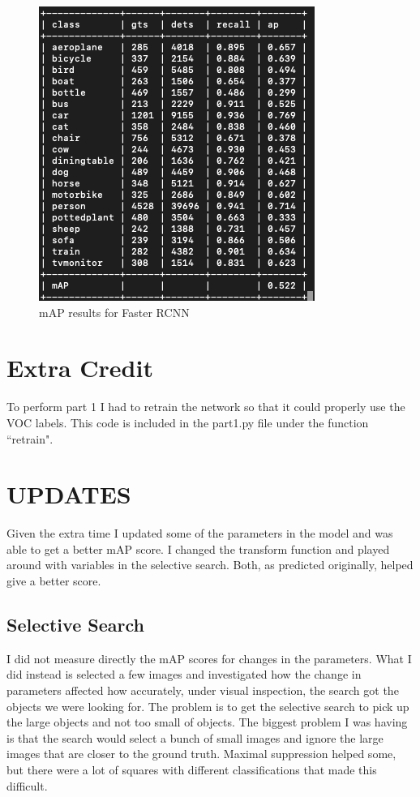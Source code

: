 \documentclass{article}
\begin{document}
\begin{figure}
\centering
\includegraphics[width=\textwidth]{faster_rcnn_r50_fpn_1x_voc07.png}
\caption{mAP results for Faster RCNN}
\label{fig:faster_rcnn}
\end{figure}

\section{Extra Credit}
To perform part 1 I had to retrain the network so that it could properly use the
VOC labels. This code is included in the part1.py file under the function
``retrain".

\section{UPDATES}
\label{sec:updates}
Given the extra time I updated some of the parameters in the model and was able
to get a better mAP score. I changed the transform function and played around
with variables in the selective search. Both, as predicted originally, helped
give a better score. 

\subsection{Selective Search}
I did not measure directly the mAP scores for changes in the parameters. What I
did instead is selected a few images and investigated how the change in
parameters affected how accurately, under visual inspection, the search got the
objects we were looking for. The problem is to get the selective search to pick
up the large objects and not too small of objects. The biggest problem I was
having is that the search would select a bunch of small images and ignore the
large images that are closer to the ground truth. Maximal suppression helped
some, but there were a lot of squares with different classifications that made
this difficult. 
\end{document}
